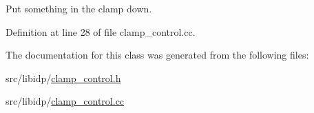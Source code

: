Put something in the clamp down. 



Definition at line 28 of file clamp\_\-control.cc.



The documentation for this class was generated from the following files:\begin{DoxyCompactItemize}
\item 
src/libidp/\hyperlink{clamp__control_8h}{clamp\_\-control.h}\item 
src/libidp/\hyperlink{clamp__control_8cc}{clamp\_\-control.cc}\end{DoxyCompactItemize}
